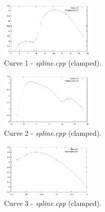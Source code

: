 \documentclass[paper=a4, fontsize=11pt]{scrartcl}
\numberwithin{equation}{section} %
\numberwithin{figure}{section} %
\numberwithin{table}{section} %
\begin{document}
\begin{figure}
	\centering
	\includegraphics[width=0.4\textwidth]
		{curve1.png}
	\caption{Curve 1 - \textit{spline.cpp} (clamped).}
\end{figure}
\begin{figure}
	\centering
	\includegraphics[width=0.4\textwidth]
		{curve2.png}
	\caption{Curve 2 - \textit{spline.cpp} (clamped).}
\end{figure}
\begin{figure}
	\centering
	\includegraphics[width=0.4\textwidth]
		{curve3.png}
	\caption{Curve 3 - \textit{spline.cpp} (clamped).}
\end{figure}
\end{document}
